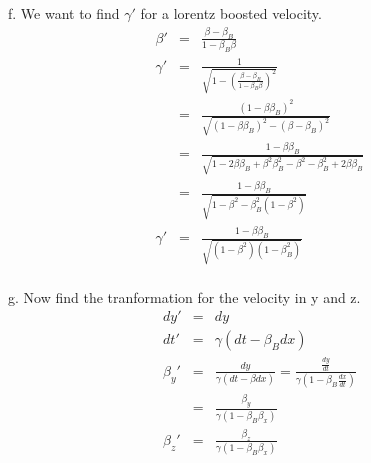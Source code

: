 \documentclass[11pt]{amsart}
\begin{document}
f. We want to find $\gamma'$ for a lorentz boosted velocity. \\
\begin{eqnarray*} 
\beta' &=& \frac{\beta-\beta_{B}}{1-\beta_{B}\beta} \\
\gamma' &=& \frac{1}{\sqrt{1-(\frac{\beta-\beta_{B}}{1-\beta_{B}\beta})^{2}}} \\
&=& \frac{(1-\beta\beta_{B})^{2}}{\sqrt{(1-\beta\beta_{B})^{2}-(\beta-\beta_{B})^{2}}} \\
&=& \frac{1-\beta\beta_{B}}{\sqrt{1-2\beta\beta_{B}+\beta^{2}\beta_{B}^{2}-\beta^{2}-\beta_{B}^{2}+2\beta\beta_{B}}} \\
&=& \frac{1-\beta\beta_{B}}{\sqrt{1-\beta^{2}-\beta_{B}^{2}(1-\beta^{2})}} \\
\gamma' &=& \frac{1-\beta\beta_{B}}{\sqrt{(1-\beta^{2})(1-\beta_{B}^{2})}} 
\end{eqnarray*} \\
g. Now find the tranformation for the velocity in y and z. \\
\begin{eqnarray*} 
dy' &=& dy \\
dt' &=& \gamma(dt-\beta_{B}{dx}) \\
\beta_{y}' &=& \frac{dy}{\gamma(dt-\beta{dx})} = \frac{\frac{dy}{dt}}{\gamma(1-\beta_{B}\frac{dx}{dt})} \\
&=& \frac{\beta_{y}}{\gamma(1-\beta_{B}\beta_{x})} \\
\beta_{z}' &=& \frac{\beta_{z}}{\gamma(1-\beta_{B}\beta_{x})} 
\end{eqnarray*} \\
\end{document}
